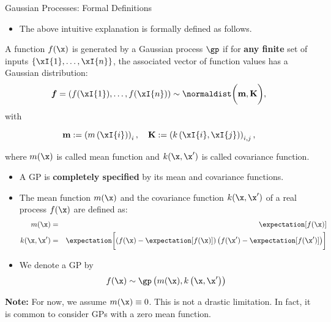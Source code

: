 \begin{frame}[c,allowframebreaks]{Gaussian Processes: Formal Definitions}

\begin{itemize}
\item The above intuitive explanation is formally defined as follows. 
\end{itemize}

\vspace{.7cm}

\begin{displayquote}
A function $f(\x)$ is generated by a Gaussian process $\gp$ if for \textbf{any finite} set of inputs $\left\{\xI{1},\dots,\xI{n}\right\}$, the associated vector of function values has a Gaussian distribution:
$$\bm{f} = \left(f(\xI{1}),\dots, f(\xI{n})\right) \sim\normaldist\biggl(\textbf{m},\textbf{K}\biggr),$$ with 

$$\textbf{m}:= \left(m\left(\xI{i}\right)\right)_{i}, \quad
\textbf{K}:= \left(k\left(\xI{i}, \xI{j}\right)\right)_{i,j},$$ 

where $m(\x)$ is called mean function and $k(\x, \x^\prime)$ is called covariance function.
\end{displayquote}

\framebreak


\begin{itemize}

\item A GP is \textbf{completely specified} by its mean and covariance functions.
\vspace{.2cm}

\item The mean function $m(\x)$ and the covariance function $k(\x, \x^\prime)$ of a real process $f(\x)$ are defined as:
\vspace{-.4cm}
\begin{eqnarray*}
m(\x) &=& \expectation[f(\x)] \\
k(\x, \x^\prime) &=& \expectation\biggl[\left( f(\x) - \expectation[f(\x)] \right) \left( f(\x^\prime) - \expectation[f(\x^\prime)] \right)\biggr]
\end{eqnarray*}

\vspace{.2cm}

\item We denote a GP by
\vspace{-.1cm}
$$f(\x) \sim \gp\left(m(\x), k\left(\x, \x^\prime\right)\right) $$
\end{itemize}

\vspace{.3cm}

\textbf{Note:} For now, we assume $m(\x)\equiv 0$. This is not a drastic limitation. In fact, it is common to consider GPs with a zero mean function.

\end{frame}

